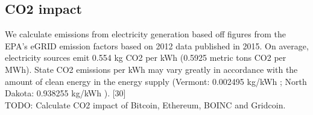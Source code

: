 \subsection{CO2 impact}

We calculate emissions from electricity generation based off figures from the EPA’s eGRID emission factors based on 2012 data published in 2015.  On average, electricity sources emit 0.554 kg CO2 per kWh (0.5925 metric tons CO2 per MWh). State CO2 emissions per kWh may vary greatly in accordance with the amount of clean energy in the energy supply (Vermont: 0.002495 kg/kWh ; North Dakota: 0.938255 kg/kWh ). [30]\\

TODO: Calculate CO2 impact of Bitcoin, Ethereum, BOINC and Gridcoin.

 